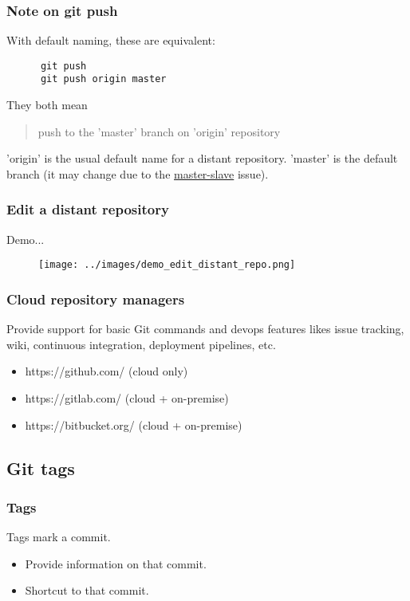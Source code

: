 \begin{frame}[fragile]
\frametitle{Note on git push}
   With default naming, these are equivalent:
   \begin{verbatim}
      git push
      git push origin master
   \end{verbatim}

   They both mean
   \begin{quotation}
      push to the 'master' branch on 'origin' repository
   \end{quotation}
   'origin' is the usual default name for a distant repository.
   'master' is the default branch (it may change due to the \href{https://tools.ietf.org/id/draft-knodel-terminology-00.html#rfc.section.1.1}{master-slave} issue).
\end{frame}

\begin{frame}
\frametitle{Edit a distant repository}
   Demo...
   \begin{figure}
      \centering
      \texttt{[image: ../images/demo\_edit\_distant\_repo.png]}
   \end{figure}
\end{frame}

\begin{frame}
\frametitle{Cloud repository managers}
   Provide support for basic Git commands and devops features likes
   issue tracking, wiki, continuous integration, deployment pipelines, etc.
   \begin{itemize}
      \item https://github.com/ (cloud only)
      \item https://gitlab.com/ (cloud + on-premise)
      \item https://bitbucket.org/ (cloud + on-premise)
   \end{itemize}
\end{frame}

\subsection{Git tags}

\begin{frame}
\frametitle{Tags}
   Tags mark a commit.
   \begin{itemize}
      \item Provide information on that commit.
      \item Shortcut to that commit.
   \end{itemize}
\end{frame}

